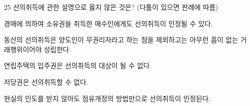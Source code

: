 \begin{question}{25}
선의취득에 관한 설명으로 옳지 않은 것은? (다툼이 있으면 판례에 따름)
\begin{choices}
  \item 경매에 의하여 소유권을 취득한 매수인에게도 선의취득이 인정될 수 있다.
  \item 동산의 선의취득은 양도인이 무권리자라고 하는 점을 제외하고는 아무런 흠이 없는 거래행위이어야 성립한다.
  \item 연립주택의 입주권은 선의취득의 대상이 될 수 없다.
  \item 저당권은 선의취득할 수 없다.
  \item 현실의 인도를 받지 않아도 점유개정의 방법만으로 선의취득이 인정된다.
\end{choices}
\end{question}
